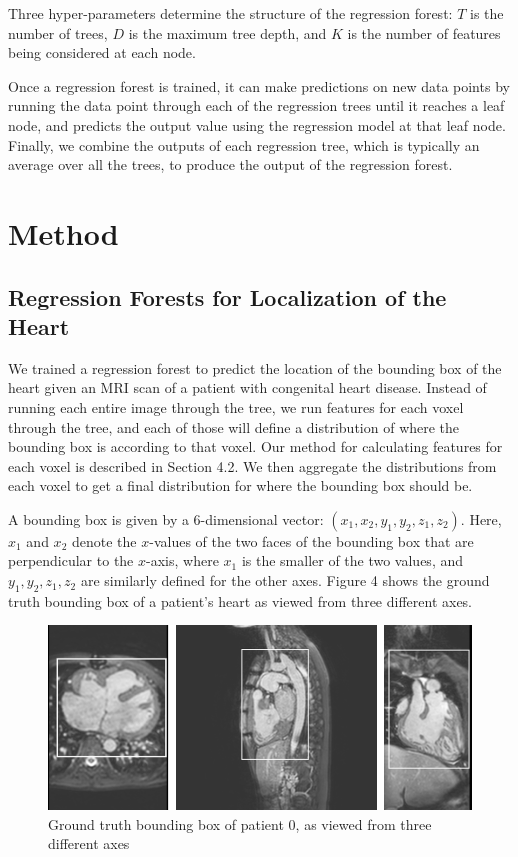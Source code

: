 Three hyper-parameters determine the structure of the regression forest: $T$ is the number of trees, $D$ is the maximum tree depth, and $K$ is the number of features being considered at each node.

Once a regression forest is trained, it can make predictions on new data points by running the data point through each of the regression trees until it reaches a leaf node, and predicts the output value using the regression model at that leaf node. Finally, we combine the outputs of each regression tree, which is typically an average over all the trees, to produce the output of the regression forest.

\section{Method}
\subsection{Regression Forests for Localization of the Heart}
We trained a regression forest to predict the location of the bounding box of the heart given an MRI scan of a patient with congenital heart disease. Instead of running each entire image through the tree, we run features for each voxel through the tree, and each of those will define a distribution of where the bounding box is according to that voxel. Our method for calculating features for each voxel is described in Section 4.2. We then aggregate the distributions from each voxel to get a final distribution for where the bounding box should be.

A bounding box is given by a 6-dimensional vector: $(x_1, x_2, y_1, y_2, z_1, z_2)$. Here, $x_1$ and $x_2$ denote the $x$-values of the two faces of the bounding box that are perpendicular to the $x$-axis, where $x_1$ is the smaller of the two values, and $y_1, y_2, z_1, z_2$ are similarly defined for the other axes. Figure 4 shows the ground truth bounding box of a patient's heart as viewed from three different axes.

\begin{figure}
\includegraphics[scale=1.0]{boundingboxes.png}
\caption{Ground truth bounding box of patient 0, as viewed from three different axes}
\end{figure}

